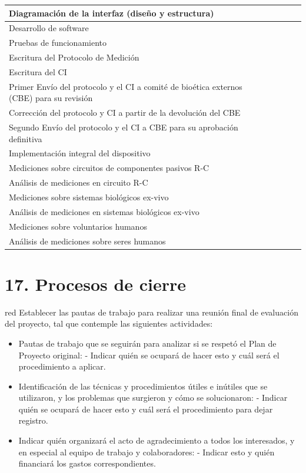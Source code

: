 \documentclass[11pt]{charter}
\begin{document}
\begin{table}[!htpb]
\begin{tabularx}{\linewidth}{@{}|X|X|X|X|X|X|@{}}
Diagramación de la interfaz (diseño y estructura) &  &  &  &  &  \\ \hline
Desarrollo de software  &  &  &  &  &  \\ \hline
Pruebas de funcionamiento &  &  &  &  &  \\ \hline
Escritura del Protocolo de Medición &  &  &  &  &  \\ \hline
Escritura del CI &  &  &  &  &  \\ \hline
Primer Envío del protocolo y el CI a comité de bioética externos (CBE) para su revisión &  &  &  &  &  \\ \hline
Corrección del protocolo y CI a partir de la devolución del CBE &  &  &  &  &  \\ \hline
Segundo Envío del protocolo y el CI a CBE para su aprobación definitiva &  &  &  &  &  \\ \hline
Implementación integral del dispositivo &  &  &  &  &  \\ \hline
Mediciones sobre circuitos de componentes pasivos R-C &  &  &  &  &  \\ \hline
Análisis de mediciones en circuito R-C &  &  &  &  &  \\ \hline
Mediciones sobre sistemas biológicos ex-vivo &  &  &  &  &  \\ \hline
Análisis de mediciones en sistemas biológicos ex-vivo &  &  &  &  &  \\ \hline
Mediciones sobre voluntarios humanos  &  &  &  &  &  \\ \hline
Análisis de mediciones sobre seres humanos &  &  &  &  &  \\ \hline
\end{tabularx}%
\end{table}

	
\pagebreak
\section{17. Procesos de cierre}    
\label{sec:cierre}

\begin{consigna}{red}
Establecer las pautas de trabajo para realizar una reunión final de evaluación del proyecto, tal que contemple las siguientes actividades:

\begin{itemize}
\item Pautas de trabajo que se seguirán para analizar si se respetó el Plan de Proyecto original:
 - Indicar quién se ocupará de hacer esto y cuál será el procedimiento a aplicar. 
\item Identificación de las técnicas y procedimientos útiles e inútiles que se utilizaron, y los problemas que surgieron y cómo se solucionaron:
 - Indicar quién se ocupará de hacer esto y cuál será el procedimiento para dejar registro.
\item Indicar quién organizará el acto de agradecimiento a todos los interesados, y en especial al equipo de trabajo y colaboradores:
  - Indicar esto y quién financiará los gastos correspondientes.
\end{itemize}

\end{consigna}
\end{document}

